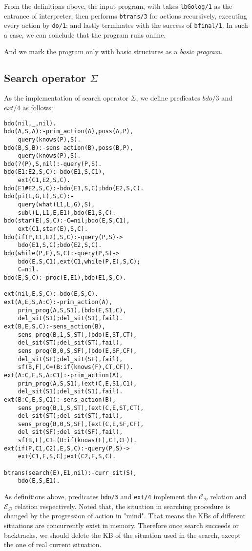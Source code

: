 \documentclass[letterpaper]{article}
\begin{document}
From the definitions above, the input program, with  takes \texttt{lbGolog/1} as the entrance of interpreter; then performs \texttt{btrans/3} for actions recursively, executing every action by \texttt{do/1}; and lastly terminates with the success of \texttt{bfinal/1}. In such a case, we can conclude that the program runs online.

And we mark the program only with basic structures as a \emph{basic program}.

\subsection{Search operator $\Sigma$}

As the implementation of search operator $\Sigma$, we define predicates $bdo/3$ and $ext/4$ as follows:
\begin{verbatim}
bdo(nil,_,nil).
bdo(A,S,A):-prim_action(A),poss(A,P),
    query(knows(P),S).
bdo(B,S,B):-sens_action(B),poss(B,P),
    query(knows(P),S).
bdo(?(P),S,nil):-query(P,S).
bdo(E1:E2,S,C):-bdo(E1,S,C1),
    ext(C1,E2,S,C).
bdo(E1#E2,S,C):-bdo(E1,S,C);bdo(E2,S,C).
bdo(pi(L,G,E),S,C):-
    query(what(L1,L,G),S),
    subl(L,L1,E,E1),bdo(E1,S,C).
bdo(star(E),S,C):-C=nil;bdo(E,S,C1),
    ext(C1,star(E),S,C).
bdo(if(P,E1,E2),S,C):-query(P,S)->
    bdo(E1,S,C);bdo(E2,S,C).
bdo(while(P,E),S,C):-query(P,S)->
    bdo(E,S,C1),ext(C1,while(P,E),S,C);
    C=nil.
bdo(E,S,C):-proc(E,E1),bdo(E1,S,C).

ext(nil,E,S,C):-bdo(E,S,C).
ext(A,E,S,A:C):-prim_action(A),
    prim_prog(A,S,S1),(bdo(E,S1,C),
    del_sit(S1);del_sit(S1),fail).
ext(B,E,S,C):-sens_action(B),
    sens_prog(B,1,S,ST),(bdo(E,ST,CT),
    del_sit(ST);del_sit(ST),fail),
    sens_prog(B,0,S,SF),(bdo(E,SF,CF),
    del_sit(SF);del_sit(SF),fail),
    sf(B,F),C=(B:if(knows(F),CT,CF)).
ext(A:C,E,S,A:C1):-prim_action(A),
    prim_prog(A,S,S1),(ext(C,E,S1,C1),
    del_sit(S1);del_sit(S1),fail).
ext(B:C,E,S,C1):-sens_action(B),
    sens_prog(B,1,S,ST),(ext(C,E,ST,CT),
    del_sit(ST);del_sit(ST),fail),
    sens_prog(B,0,S,SF),(ext(C,E,SF,CF),
    del_sit(SF);del_sit(SF),fail),
    sf(B,F),C1=(B:if(knows(F),CT,CF)).
ext(if(P,C1,C2),E,S,C):-query(P,S)->
    ext(C1,E,S,C);ext(C2,E,S,C).

btrans(search(E),E1,nil):-curr_sit(S),
    bdo(E,S,E1).
\end{verbatim}

As definitions above, predicates \texttt{bdo/3} and \texttt{ext/4} implement the $\mathcal{C_D}$ relation and $\mathcal{E_D}$ relation respectively.
Noted that, the situation in searching procedure is changed by the progression of action in "mind". That means the KBs of different situations are concurrently exist in memory. Therefore once search succeeds or backtracks, we should delete the KB of the situation used in the search, except the one of real current situation.
\end{document}

